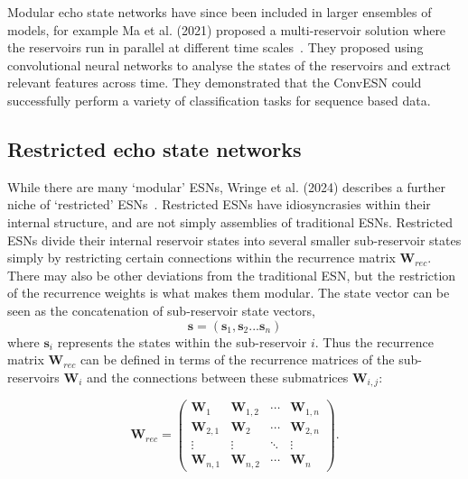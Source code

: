 

Modular echo state networks have since been included in larger ensembles of models, for example Ma et al. (2021) proposed a multi-reservoir solution where the reservoirs run in parallel at different time scales~\cite{ma_2021}. They proposed using convolutional neural networks to analyse the states of the reservoirs and extract relevant features across time. They demonstrated that the ConvESN could successfully perform a variety of classification tasks for sequence based data.


\subsection{Restricted echo state networks}

While there are many `modular' ESNs, Wringe et al. (2024) describes a further niche of `restricted' ESNs~\cite{wringe_2024}. Restricted ESNs have idiosyncrasies within their internal structure, and are not simply assemblies of traditional ESNs. Restricted ESNs divide their internal reservoir states into several smaller sub-reservoir states simply by restricting certain connections within the recurrence matrix $\mathbf{W}_{rec}$. There may also be other deviations from the traditional ESN, but the restriction of the recurrence weights is what makes them modular. The state vector can be seen as the concatenation of sub-reservoir state vectors,
\[
    \mathbf{s} = (\mathbf{s}_1, \mathbf{s}_2...\mathbf{s}_n)
\]
where $\mathbf{s}_i$ represents the states within the sub-reservoir $i$. Thus the recurrence matrix $\mathbf{W}_{rec}$ can be defined in terms of the recurrence matrices of the sub-reservoirs $\mathbf{W}_{i}$ and the connections between these submatrices $\mathbf{W}_{i,j}$:

\[
    \mathbf{W}_{rec} = \begin{pmatrix}
        \mathbf{W}_{1} & \mathbf{W}_{1,2} & \cdots & \mathbf{W}_{1,n} \\
        \mathbf{W}_{2,1} & \mathbf{W}_{2} & \cdots & \mathbf{W}_{2,n} \\
        \vdots & \vdots & \ddots & \vdots \\
        \mathbf{W}_{n,1} & \mathbf{W}_{n,2} & \cdots & \mathbf{W}_{n}
    \end{pmatrix}.
\]


